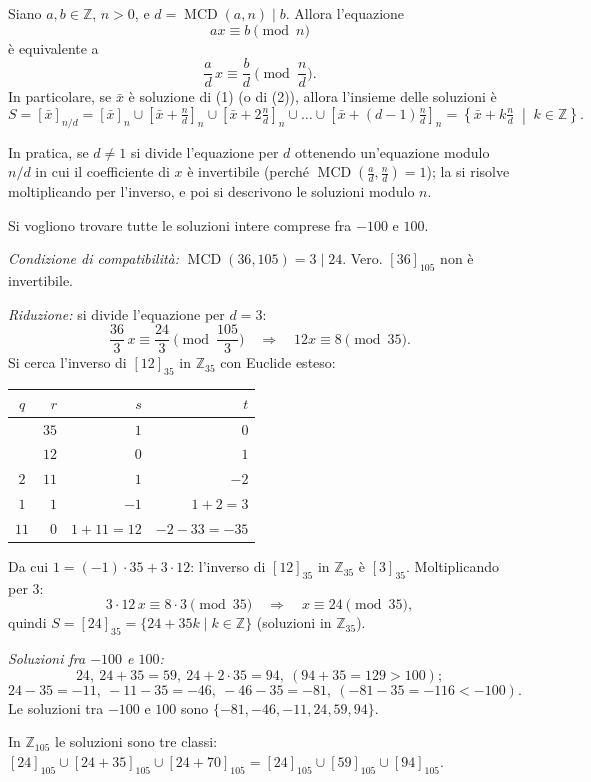 \documentclass[11pt,a4paper]{article}
\begin{document}
\begin{proposizione}
Siano $a, b \in \mathbb{Z}$, $n > 0$, e $d = \operatorname{MCD}(a, n) \mid b$. Allora l'equazione
\[
  ax \equiv b \pmod n \tag{1}
\]
è equivalente a
\[
  \frac{a}{d}\,x \equiv \frac{b}{d} \pmod{\frac{n}{d}} . \tag{2}
\]
In particolare, se $\bar{x}$ è soluzione di (1) (o di (2)), allora l'insieme delle soluzioni è
\[
  S = \left[\bar{x}\right]_{n/d} = \left[\bar{x}\right]_n \cup \left[\bar{x} + \tfrac{n}{d}\right]_n \cup \left[\bar{x} + 2\tfrac{n}{d}\right]_n \cup \dots \cup \left[\bar{x} + (d-1)\tfrac{n}{d}\right]_n = \left\{\bar{x} + k\tfrac{n}{d} \;\middle|\; k \in \mathbb{Z}\right\}.
\]
\end{proposizione}

In pratica, se $d \neq 1$ si divide l'equazione per $d$ ottenendo un'equazione modulo $n/d$ in cui il coefficiente di $x$ è invertibile (perché $\operatorname{MCD}\!\left(\tfrac{a}{d}, \tfrac{n}{d}\right) = 1$); la si risolve moltiplicando per l'inverso, e poi si descrivono le soluzioni modulo $n$.

\begin{esempio}
Si vogliono trovare tutte le soluzioni intere comprese fra $-100$ e $100$.

\emph{Condizione di compatibilità:} $\operatorname{MCD}(36, 105) = 3 \mid 24$. Vero. $[36]_{105}$ non è invertibile.

\emph{Riduzione:} si divide l'equazione per $d = 3$:
\[
  \frac{36}{3}\,x \equiv \frac{24}{3} \pmod{\frac{105}{3}} \quad\Rightarrow\quad 12x \equiv 8 \pmod{35}.
\]
Si cerca l'inverso di $[12]_{35}$ in $\mathbb{Z}_{35}$ con Euclide esteso:
\begin{center}
\begin{tabular}{c|r|r|r}
$q$ & $r$ & $s$ & $t$ \\
\midrule
 & $35$ & $1$ & $0$ \\
 & $12$ & $0$ & $1$ \\
$2$ & $11$ & $1$ & $-2$ \\
$1$ & $1$ & $-1$ & $1 + 2 = 3$ \\
$11$ & $0$ & $1 + 11 = 12$ & $-2 - 33 = -35$ \\
\end{tabular}
\end{center}
Da cui $1 = (-1)\cdot 35 + 3\cdot 12$: l'inverso di $[12]_{35}$ in $\mathbb{Z}_{35}$ è $[3]_{35}$. Moltiplicando per $3$:
\[
  3\cdot 12\,x \equiv 8\cdot 3 \pmod{35} \quad\Rightarrow\quad x \equiv 24 \pmod{35},
\]
quindi $S = [24]_{35} = \{24 + 35k \mid k \in \mathbb{Z}\}$ (soluzioni in $\mathbb{Z}_{35}$).

\emph{Soluzioni fra $-100$ e $100$:}
\[
  24,\ 24 + 35 = 59,\ 24 + 2\cdot 35 = 94,\ (94 + 35 = 129 > 100);
\]
\[
  24 - 35 = -11,\ -11 - 35 = -46,\ -46 - 35 = -81,\ (-81 - 35 = -116 < -100).
\]
Le soluzioni tra $-100$ e $100$ sono $\{-81, -46, -11, 24, 59, 94\}$.

In $\mathbb{Z}_{105}$ le soluzioni sono tre classi: $[24]_{105} \cup [24 + 35]_{105} \cup [24 + 70]_{105} = [24]_{105} \cup [59]_{105} \cup [94]_{105}$.
\end{esempio}
\end{document}
